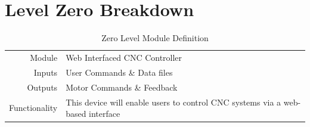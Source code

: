 \section{Level Zero Breakdown}
\begin{table}[H] 
	\caption{Zero Level Module Definition}
	\label{table:zerolevel}
	\centering 
	\begin{tabular}{|r p{10cm}|} 
		\hline\hline
		Module		& Web Interfaced CNC Controller \\ 
		Inputs		& User Commands \& Data files 	\\ 
		Outputs		& Motor Commands \& Feedback	\\ 
		Functionality	& This device will enable users to control CNC systems via a web-based interface 	\\ 
		\hline
		\end{tabular} 
\end{table}

